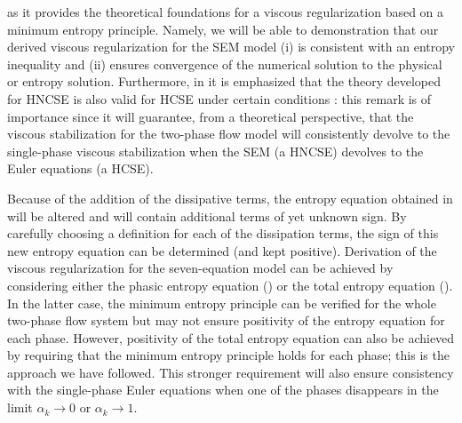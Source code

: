 as it provides the theoretical foundations for a viscous regularization based on a minimum entropy principle. Namely, 
we will be able to demonstration that our derived viscous regularization for the SEM model
(i) is consistent with an entropy inequality and (ii) ensures convergence of the numerical solution to the physical or entropy solution. 
Furthermore, in \cite{dlm,bianchini_bressan_2005,lefloch_1989} it is emphasized that the theory developed 
for HNCSE is also valid for HCSE under certain conditions : this remark is of importance since it will guarantee, from a 
theoretical perspective, that the viscous stabilization for the two-phase flow model will consistently devolve to the single-phase viscous stabilization
when the SEM (a HNCSE) devolves to the Euler equations (a HCSE). 

Because of the addition of the dissipative terms, the entropy equation obtained in 
will be altered and will contain additional terms of yet unknown sign. By carefully choosing 
a definition for each of the dissipation terms, the sign of this new entropy equation can be determined (and kept positive). Derivation of the viscous 
regularization for the seven-equation model can be achieved by considering either the phasic entropy equation () or the 
total entropy equation (). In the latter case, the minimum entropy principle can be verified for the whole two-phase flow system 
but may not ensure positivity of the entropy equation for each phase. However, positivity of the total entropy equation can also be achieved by requiring 
that the minimum entropy principle holds for each phase; this is the approach we have followed. This stronger requirement will also ensure consistency 
with the single-phase Euler equations when one of the phases disappears in the limit $\alpha_k \to 0$ or $\alpha_k \to 1$. 
%
